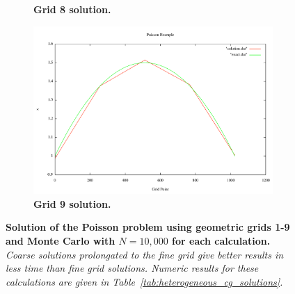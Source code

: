 \documentclass[note]{TechNote}
\begin{document}
\begin{figure}[h!]
\begin{subfigure}[b]{0.32\textwidth}
    \caption{\textbf{Grid 8 solution.}}
  \end{subfigure}
  \begin{subfigure}[b]{0.32\textwidth}
    \includegraphics[width=\textwidth]{cg_9_level.pdf}
    \caption{\textbf{Grid 9 solution.}}
  \end{subfigure}
  \caption{\textbf{Solution of the Poisson problem using geometric
      grids 1-9 and Monte Carlo with $N = 10,000$ for each
      calculation.} \textit{Coarse solutions prolongated to the fine
      grid give better results in less time than fine grid
      solutions. Numeric results for these calculations are given in
      Table~\ref{tab:heterogeneous_cg_solutions}.}}
  \label{fig:heterogeneous_cg_solutions}
\end{figure}

\clearpage




\closing
\caution
\end{document}
